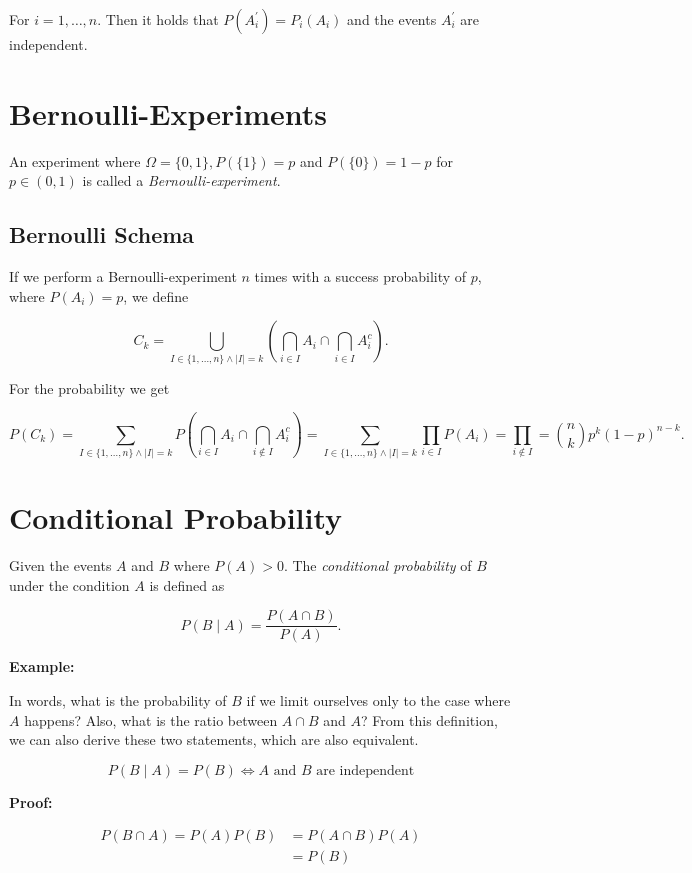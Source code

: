 For \(i = 1, \dots, n\). Then it holds that \(P(A_{i}^{'}) = P_i(A_i)\) and the events \(A_{i}^{'}\) are 
independent.

\section{Bernoulli-Experiments}

An experiment where \(\Omega = \{0,1\}, P(\{1\}) = p\) and \(P(\{0\}) = 1 - p\) for 
\(p \in (0, 1)\) is called a \emph{Bernoulli-experiment}.

\subsection{Bernoulli Schema}

If we perform a Bernoulli-experiment \(n\) times with a success probability of \(p\), where 
\(P(A_i) = p\), we define 

\[
    C_k = \bigcup_{I \in \{1, \dots, n\} \land |I| = k} \left(\bigcap_{i \in I} A_i \cap \bigcap_{i \in I} A_{i}^{c}\right).
\]

For the probability we get 

\[
    P(C_k) = \sum_{I \in \{1, \dots, n\} \land |I| = k} P \left(\bigcap_{i \in I} A_i \cap \bigcap_{i \notin I} A_{i}^{c}\right) = 
    \sum_{I \in \{1, \dots, n\} \land |I| = k} \prod_{i \in I} P(A_i) = \prod_{i \notin I} = \binom{n}{k} p^k (1 - p)^{n - k}.
\]

\section{Conditional Probability}

Given the events \(A\) and \(B\) where \(P(A) > 0\). The \emph{conditional probability} 
of \(B\) under the condition \(A\) is defined as 

\[
    P(B \mid A) = \frac{P(A \cap B)}{P(A)}.
\]

\textbf{Example:}

In words, what is the probability of \(B\) if we limit ourselves only to the case where \(A\) happens? Also, what is the ratio between \(A \cap B\) and \(A\)?
From this definition, we can also derive these two statements, which are also equivalent. 

\[
    P(B \mid A) = P(B) \iff A \text{ and } B \text{ are independent}
\]

\textbf{Proof:}

\begin{align*}	
    P(B \cap A) = P(A)P(B) &= P(A \cap B){P(A)}\\ 
    &= P(B)	
\end{align*}

